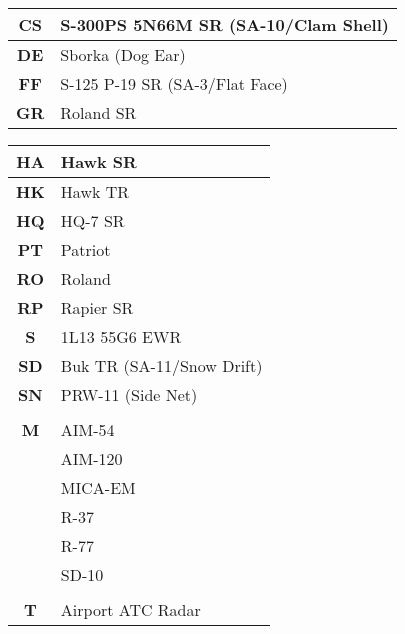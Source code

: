 \documentclass[fontMetropolis]{TechCheck}
\begin{document}
\begin{multicols*}{2}
\begin{center}
\begin{tabular}{c | p{4cm}}
			\midrule
			\textbf{CS} & S-300PS 5N66M SR (SA-10/Clam Shell) \\
			\midrule
			\textbf{DE} & Sborka (Dog Ear) \\
			\midrule
			\textbf{FF} & S-125 P-19 SR (SA-3/Flat Face) \\
			\midrule
			\textbf{GR} & Roland SR \\
			\midrule
		\end{tabular}
	\end{center}
	\begin{center}
		\begin{tabular}{c | p{4cm}}
			\textbf{HA} & Hawk SR \\
			\midrule
			\textbf{HK} & Hawk TR \\
			\midrule
			\textbf{HQ} & HQ-7 SR \\
			\midrule
			\textbf{PT} & Patriot \\
			\midrule
			\textbf{RO} & Roland \\
			\midrule
			\textbf{RP} & Rapier SR \\
			\midrule
			\textbf{S} & 1L13 55G6 EWR \\
			\midrule
			\textbf{SD} & Buk TR (SA-11/Snow Drift) \\
			\midrule
			\textbf{SN} & PRW-11 (Side Net) \\
			\midrule
			\multicolumn{2}{c}{\blue{MISSILES}} \\
			\toprule
			\textbf{M} & AIM-54 \\
			& AIM-120 \\
			& MICA-EM \\
			& R-37 \\
			& R-77 \\
			& SD-10 \\
			\midrule
			\multicolumn{2}{c}{\blue{ATC}} \\
			\toprule
			\textbf{T} & Airport ATC Radar \\
			\bottomrule
		\end{tabular}
	\end{center}
	\end{multicols*}
\end{document}
